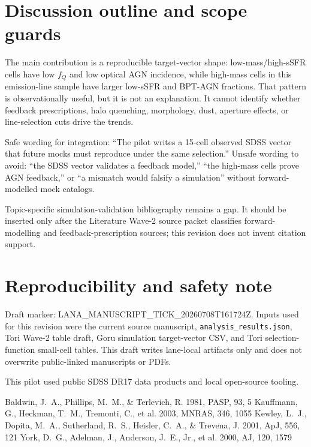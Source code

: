 \documentclass[twocolumn]{aastex631}
\begin{document}
\section{Discussion outline and scope guards}\label{sec:discussion}
The main contribution is a reproducible target-vector shape: low-mass/high-sSFR cells have low $f_Q$ and low optical AGN incidence, while high-mass cells in this emission-line sample have larger low-sSFR and BPT-AGN fractions.  That pattern is observationally useful, but it is not an explanation.  It cannot identify whether feedback prescriptions, halo quenching, morphology, dust, aperture effects, or line-selection cuts drive the trends.

Safe wording for integration: ``The pilot writes a 15-cell observed SDSS vector that future mocks must reproduce under the same selection.''  Unsafe wording to avoid: ``the SDSS vector validates a feedback model,'' ``the high-mass cells prove AGN feedback,'' or ``a mismatch would falsify a simulation'' without forward-modelled mock catalogs.

Topic-specific simulation-validation bibliography remains a gap.  It should be inserted only after the Literature Wave-2 source packet classifies forward-modelling and feedback-prescription sources; this revision does not invent citation support.

\section*{Reproducibility and safety note}
Draft marker: LANA\_MANUSCRIPT\_TICK\_20260708T161724Z.  Inputs used for this revision were the current source manuscript, \texttt{analysis\_results.json}, Tori Wave-2 table draft, Goru simulation target-vector CSV, and Tori selection-function small-cell tables.  This draft writes lane-local artifacts only and does not overwrite public-linked manuscripts or PDFs.

\acknowledgments
This pilot used public SDSS DR17 data products and local open-source tooling.

\begin{thebibliography}{}
 Baldwin, J.~A., Phillips, M.~M., \& Terlevich, R. 1981, PASP, 93, 5
 Kauffmann, G., Heckman, T.~M., Tremonti, C., et al. 2003, MNRAS, 346, 1055
 Kewley, L.~J., Dopita, M.~A., Sutherland, R.~S., Heisler, C.~A., \& Trevena, J. 2001, ApJ, 556, 121
 York, D.~G., Adelman, J., Anderson, J.~E., Jr., et al. 2000, AJ, 120, 1579
\end{thebibliography}
\end{document}
